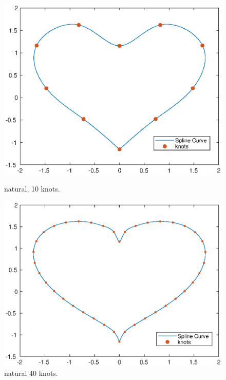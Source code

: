 \documentclass[11pt,en]{elegantpaper}
\begin{document}
\begin{figure}[htbp]
    \centering
    \begin{minipage}[t]{0.33\linewidth}
        \centering
        \includegraphics[width=0.95\linewidth]{figure/assE_10knots.eps}
        \caption{natural, 10 knots.}
        \label{fig:side:a}
    \end{minipage}%
    \begin{minipage}[t]{0.33\linewidth}
        \centering
        \includegraphics[width=0.95\linewidth]{figure/assE_40knots.eps}
        \caption{natural 40 knots.}
        \label{fig:side:b}
    \end{minipage}
    \begin{minipage}[t]{0.33\linewidth}
        \centering

\end{minipage}
\end{figure}
\end{document}
